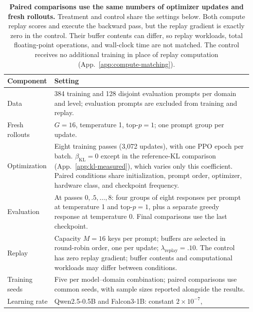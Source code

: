 \begin{table}[!htbp]
  \centering
  \caption{\textbf{Paired comparisons use the same numbers of optimizer updates and fresh rollouts.}
  Treatment and control share the settings below. Both compute replay scores
  and execute the backward pass, but the replay gradient is exactly zero in
  the control. Their buffer contents can differ, so replay workloads, total
  floating-point operations, and wall-clock time are not matched. The control
  receives no additional training in place of replay computation
  (App.~\ref{app:compute-matching}).}

  \label{tab:run-contract}
  \small
  \begin{tabularx}{\linewidth}{@{}P{.23\linewidth}Y@{}}
    \toprule
    \textbf{Component} & \textbf{Setting} \\
    \midrule
    Data & 384 training and 128 disjoint evaluation prompts per domain and
      level; evaluation prompts are excluded from training and replay. \\
    Fresh rollouts & $G=16$, temperature 1, top-$p=1$; one prompt group per update. \\
    Optimization & Eight training passes (3,072 updates), with one PPO epoch
      per batch. $\beta_{\mathrm{KL}}=0$ except in the reference-KL comparison
      (App.~\ref{app:kl-measured}), which varies only this coefficient.
      Paired conditions share initialization, prompt order, optimizer,
      hardware class, and checkpoint frequency. \\
    Evaluation & At passes $0,.5,\ldots,8$: four groups of eight responses
      per prompt at temperature 1 and top-$p=1$, plus a separate greedy
      response at temperature 0. Final comparisons use the last checkpoint. \\
    Replay & Capacity $M=16$ keys per prompt; buffers are selected in
      round-robin order, one per update; $\lambda_{\mathrm{replay}}=.10$.
      The control has zero replay gradient; buffer contents and computational
      workloads may differ between conditions. \\
    Training seeds & Five per model--domain combination; paired comparisons use
      common seeds, with sample sizes reported alongside the results. \\
    Learning rate & Qwen2.5-0.5B and Falcon3-1B: constant $2\times10^{-7}$,

\end{tabularx}
\end{table}
